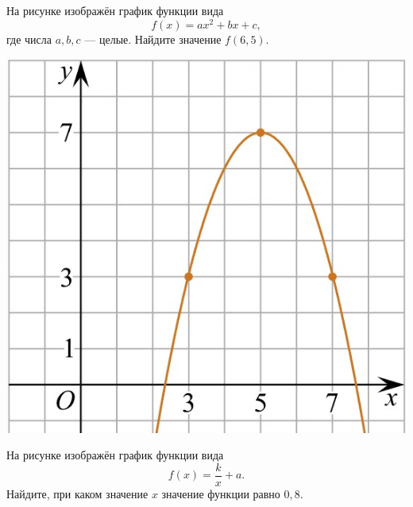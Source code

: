 \begin{class}[number=5]
	\begin{listofex}
		\item
		\begin{minipage}[t]{\bodywidth}
			На рисунке изображён график функции вида \[ f(x)=ax^2+bx+c, \] где числа \(a, b, c\) --- целые. Найдите значение \(f(6,5)\).
		\end{minipage}
		\hspace{0.05\linewidth}
		\begin{minipage}[t]{\picwidth}
			\includegraphics[align=t, width=\textwidth]{pics/G101M4H2-5.jpg}
		\end{minipage}
		\item
		\begin{minipage}[t]{\bodywidth}
			На рисунке изображён график функции вида \[ f(x)=\dfrac{k}{x}+a. \] Найдите, при каком значение \( x \) значение функции равно \(0,8\).
		\end{minipage}
		\hspace{0.05\linewidth}
		\begin{minipage}[t]{\picwidth}

\end{minipage}
\end{listofex}
\end{class}

